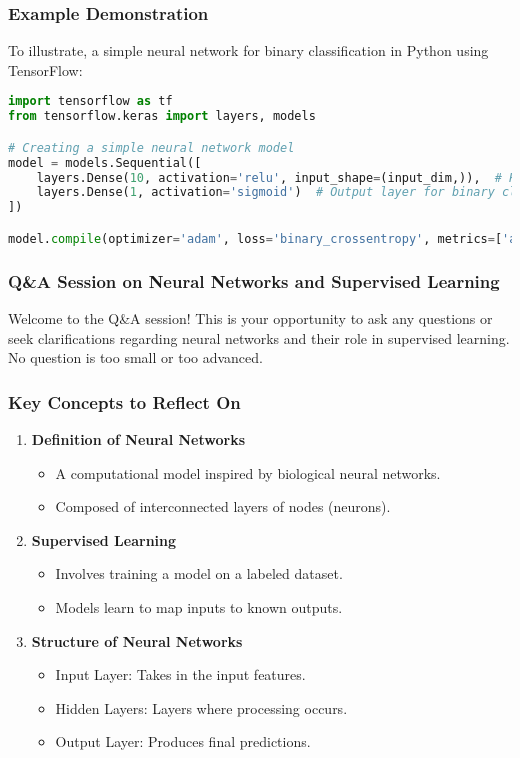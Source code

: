 \documentclass[aspectratio=169]{beamer}
\begin{document}
\begin{frame}[fragile]
  \frametitle{Example Demonstration}
  To illustrate, a simple neural network for binary classification in Python using TensorFlow:

  \begin{lstlisting}[language=Python]
import tensorflow as tf
from tensorflow.keras import layers, models

# Creating a simple neural network model
model = models.Sequential([
    layers.Dense(10, activation='relu', input_shape=(input_dim,)),  # Hidden layer
    layers.Dense(1, activation='sigmoid')  # Output layer for binary classification
])

model.compile(optimizer='adam', loss='binary_crossentropy', metrics=['accuracy'])
  \end{lstlisting}
\end{frame}

\begin{frame}[fragile]
  \frametitle{Q\&A Session on Neural Networks and Supervised Learning}
  Welcome to the Q\&A session! This is your opportunity to ask any questions or seek clarifications regarding neural networks and their role in supervised learning. No question is too small or too advanced.
\end{frame}

\begin{frame}[fragile]
  \frametitle{Key Concepts to Reflect On}
  \begin{enumerate}
    \item \textbf{Definition of Neural Networks}
    \begin{itemize}
      \item A computational model inspired by biological neural networks.
      \item Composed of interconnected layers of nodes (neurons).
    \end{itemize}

    \item \textbf{Supervised Learning}
    \begin{itemize}
      \item Involves training a model on a labeled dataset.
      \item Models learn to map inputs to known outputs.
    \end{itemize}

    \item \textbf{Structure of Neural Networks}
    \begin{itemize}
      \item Input Layer: Takes in the input features.
      \item Hidden Layers: Layers where processing occurs.
      \item Output Layer: Produces final predictions.
    \end{itemize}
  \end{enumerate}
\end{frame}
\end{document}
